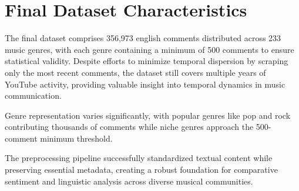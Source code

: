 \section{Final Dataset Characteristics}

The final dataset comprises 356,973 english comments distributed across 233 music genres, with each genre containing a minimum of 500 comments to ensure statistical validity. Despite efforts to minimize temporal dispersion by scraping only the most recent comments, the dataset still covers multiple years of YouTube activity, providing valuable insight into temporal dynamics in music communication.

Genre representation varies significantly, with popular genres like pop and rock contributing thousands of comments while niche genres approach the 500-comment minimum threshold. 

The preprocessing pipeline successfully standardized textual content while preserving essential metadata, creating a robust foundation for comparative sentiment and linguistic analysis across diverse musical communities.
